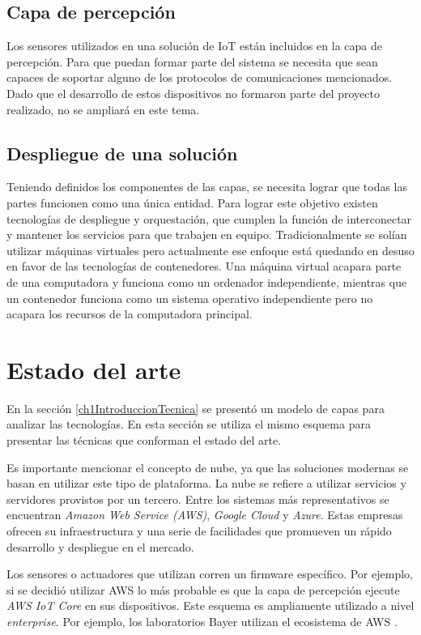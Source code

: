 \subsection{Capa de percepción}
Los sensores utilizados en una solución de IoT están incluidos en la capa de percepción.
Para que puedan formar parte del sistema se necesita que sean capaces de soportar alguno de los protocolos de comunicaciones mencionados. Dado que el desarrollo de estos dispositivos no formaron parte del proyecto realizado, no se ampliará en este tema.

\subsection{Despliegue de una solución}
Teniendo definidos los componentes de las capas, se necesita lograr que todas las partes funcionen como una única entidad. Para lograr este objetivo existen tecnologías de despliegue y orquestación, que cumplen la función de interconectar y mantener los servicios para que trabajen en equipo. Tradicionalmente se solían utilizar máquinas virtuales pero actualmente ese enfoque está quedando en desuso en favor de las tecnologías de contenedores. Una máquina virtual acapara parte de una computadora y funciona como un ordenador independiente, mientras que un contenedor funciona como un sistema operativo independiente pero no acapara los recursos de la computadora principal.


\section{Estado del arte}
\label{ch1EstadoDelArte}

En la sección \ref{ch1IntroduccionTecnica} se presentó un modelo de capas para analizar las tecnologías.
En esta sección se utiliza el mismo esquema para presentar las técnicas que conforman el estado del arte.

Es importante mencionar el concepto de nube, ya que las soluciones modernas se basan en utilizar este tipo de plataforma.
La nube se refiere a utilizar servicios y servidores provistos por un tercero.
Entre los sistemas más representativos se encuentran \emph{Amazon Web Service (AWS)}, \emph{Google Cloud} y \emph{Azure}.
Estas empresas ofrecen su infraestructura y una serie de facilidades que promueven un rápido desarrollo y despliegue en el mercado.

Los sensores o actuadores que utilizan corren un firmware específico.
Por ejemplo, si se decidió utilizar AWS lo más probable es que la capa de percepción ejecute \emph{AWS IoT Core} en sus dispositivos.
Este esquema es ampliamente utilizado a nivel \emph{enterprise}.
Por ejemplo, los laboratorios Bayer utilizan el ecosistema de AWS \citep{WEBSITE:AWSBayer}.

